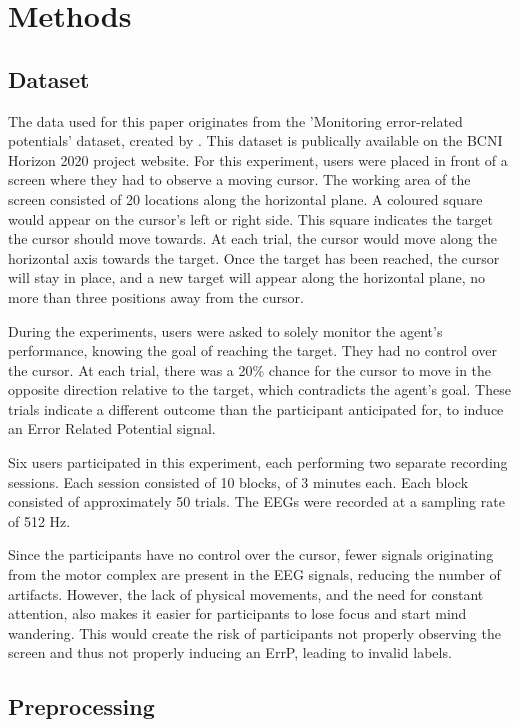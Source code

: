 \section{Methods}\label{sec:methods}

\subsection{Dataset}

The data used for this paper originates from the 'Monitoring error-related potentials' dataset, created by \cite{chavarriaga2010learning}. This dataset is publically available on the BCNI Horizon 2020 project website. For this experiment, users were placed in front of a screen where they had to observe a moving cursor. The working area of the screen consisted of 20 locations along the horizontal plane. A coloured square would appear on the cursor's left or right side. This square indicates the target the cursor should move towards. At each trial, the cursor would move along the horizontal axis towards the target. Once the target has been reached, the cursor will stay in place, and a new target will appear along the horizontal plane, no more than three positions away from the cursor.

During the experiments, users were asked to solely monitor the agent's performance, knowing the goal of reaching the target. They had no control over the cursor. At each trial, there was a 20\% chance for the cursor to move in the opposite direction relative to the target, which contradicts the agent's goal. These trials indicate a different outcome than the participant anticipated for, to induce an Error Related Potential signal.

Six users participated in this experiment, each performing two separate recording sessions. Each session consisted of 10 blocks, of 3 minutes each. Each block consisted of approximately 50 trials. The EEGs were recorded at a sampling rate of 512 Hz.

Since the participants have no control over the cursor, fewer signals originating from the motor complex are present in the EEG signals, reducing the number of artifacts. However, the lack of physical movements, and the need for constant attention, also makes it easier for participants to lose focus and start mind wandering. This would create the risk of participants not properly observing the screen and thus not properly inducing an ErrP, leading to invalid labels. 

\subsection{Preprocessing}

